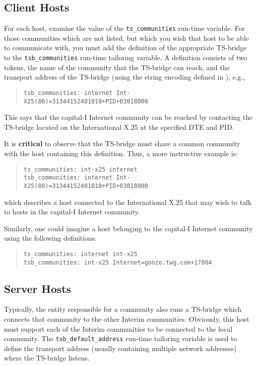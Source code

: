 {\subsection	{Client Hosts}
For each host,
examine the value of the \verb"ts_communities" run-time variable.
For those communities which are not listed,
but which you wish that host to be able to communicate with,
you must add the definition of the appropriate TS-bridge to the
\verb"tsb_communities" run-time tailoring variable.
A definition consists of two tokens,
the name of the community that the TS-bridge can reach,
and the transport address of the TS-bridge
(using the string encoding defined in \cite{String.Addresses}),
e.g.,
\begin{quote}\smaller\begin{verbatim}
tsb_communities: internet Int-X25(80)=31344152401010+PID+03018000
\end{verbatim}\end{quote}
This says that the capital-I Internet community can be reached by contacting
the TS-bridge located on the International X.25 at the specified DTE and PID.

It is {\bf critical\/} to observe that the TS-bridge must share a common
community with the host containing this definition.
Thus,
a more instructive example is:
\begin{quote}\smaller\begin{verbatim}
ts_communities: int-x25 internet
tsb_communities: internet Int-X25(80)=31344152401010+PID+03018000
\end{verbatim}\end{quote}
which describes a host connected to the International X.25 that may wish to
talk to hosts in the capital-I Internet community.

Similarly,
one could imagine a host belonging to the capital-I Internet community using
the following definitions:
\begin{quote}\smaller\begin{verbatim}
ts_communities: internet int-x25
tsb_communities: int-x25 Internet=gonzo.twg.com+17004
\end{verbatim}\end{quote}

\subsection	{Server Hosts}
Typically,
the entity responsible for a community also runs a TS-bridge which connects
that community to the other Interim communities.
Obviously,
this host must support each of the Interim communities to be connected to the
local community.
The \verb"tsb_default_address" run-time tailoring variable is used to define
the transport address (usually containing multiple network addresses) where
the TS-bridge listens.

}
